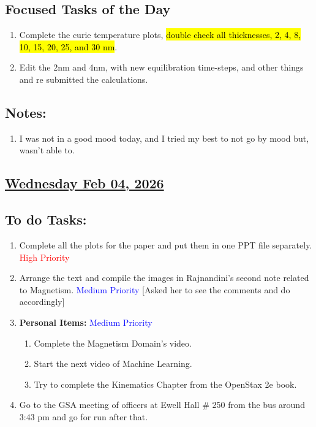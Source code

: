 \subsection*{Focused Tasks of the Day}
\begin{enumerate}  %
     \item Complete the curie temperature plots, \hl{double check all thicknesses, 2, 4, 8, 10, 15, 20, 25, and 30 nm}.
     \item Edit the 2nm and 4nm, with new equilibration time-steps, and other things and re submitted the calculations.
\end{enumerate}
\subsection*{Notes:}
\begin{enumerate}
    \item I was not in a good mood today, and I tried my best to not go by mood but, wasn't able to.
\end{enumerate}
\subsection*{\underline{Wednesday Feb 04, 2026} }
\subsection*{To do Tasks:}
\begin{enumerate}
    \item Complete all the plots for the paper and put them in one PPT file separately. \textcolor{red}{High Priority} \cmark
    \item Arrange the text and compile the images in Rajnandini's second note related to Magnetism. \textcolor{blue}{Medium Priority} [Asked her to see the comments and do accordingly] \cmark 
    \item \textbf{Personal Items:} \textcolor{blue}{Medium Priority}
    \begin{enumerate}
        \item Complete the Magnetism Domain's video.
        \item Start the next video of Machine Learning.
        \item Try to complete the Kinematics Chapter from the OpenStax 2e book.
    \end{enumerate}
    \item Go to the GSA meeting of officers at Ewell Hall \# 250 from the bus around 3:43 pm and go for run after that.
\end{enumerate}

